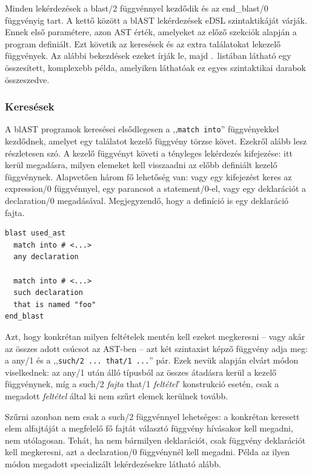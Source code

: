 Minden lekérdezések a \cfn blast/2 függvénnyel kezdődik és az \cfn end\_blast/0 függvényig tart.
A kettő között a blAST lekérdezések \gls{eDSL} szintaktikáját várják.
Ennek első paramétere, azon \gls{AST} érték, amelyeket az előző szekciók alapján a program definiált.
Ezt követik az keresések és az extra találatokat lekezelő függvények.
Az alábbi bekezdések ezeket írják le, majd .~listában látható egy összesített, komplexebb példa, amelyiken láthatóak ez egyes szintaktikai darabok összeszedve.

\subsubsection*{Keresések}

A blAST programok keresései elsődlegesen a {,,{\tt match into}''} függvényekkel kezdődnek, amelyet egy találatot kezelő függvény törzse követ.
Ezekről alább lesz részletesen szó.
A kezelő függvényt követi a tényleges lekérdezés kifejezése: itt kerül megadásra, milyen elemeket kell visszaadni az előbb definiált kezelő függvénynek.
Alapvetően három fő lehetőség van: vagy egy kifejezést keres az \cfn expression/0 függvénnyel, egy parancsot a \cfn statement/0-el, vagy egy deklarációt a \cfn declaration/0 megadásával.
Megjegyzendő, hogy a definíció is egy deklaráció fajta.

\begin{lstlisting}[caption={Különböző lekérdezések blAST-al},label={lst:queries}]
blast used_ast
  match into # <...>
  any declaration

  match into # <...>
  such declaration
  that is named "foo"
end_blast
\end{lstlisting}

Azt, hogy konkrétan milyen feltételek mentén kell ezeket megkeresni -- vagy akár az összes adott csúcsot az \gls{AST}-ben -- azt két szintaxist képző függvény adja meg: a \cfn any/1 és a ,,{\tt such/2 \rm ... \tt that/1 \rm ...}'' pár.
Ezek nevük alapján elvárt módon viselkednek: az \cfn any/1 után álló típusból az összes átadásra kerül a kezelő függvénynek, míg a \cfn such/2 {\it fajta} \cfn that/1 {\it feltétel}' konstrukció esetén, csak a megadott {\it feltétel} által ki nem szűrt elemek kerülnek tovább.

Szűrni azonban nem csak a \cfn such/2 függvénnyel lehetséges: a konkrétan keresett elem alfajtáját a megfelelő fő fajtát választó függvény hívásakor kell megadni, nem utólagosan.
Tehát, ha nem bármilyen deklarációt, csak függvény deklarációt kell megkeresni, azt a \cfn declaration/0 függvénynél kell megadni.
Példa az ilyen módon megadott specializált lekérdezésekre látható alább.

